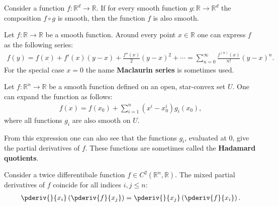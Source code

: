     \begin{theorem}[Boman]
        Consider a function $f:\mathbb{R}^d\rightarrow\mathbb{R}$. If for every smooth function $g:\mathbb{R}\rightarrow\mathbb{R}^d$ the composition $f\circ g$ is smooth, then the function $f$ is also smooth.
    \end{theorem}

    \begin{property}
        Let $f:\mathbb{R}\rightarrow\mathbb{R}$ be a smooth function. Around every point $x\in\mathbb{R}$ one can express $f$ as the following series:
        \begin{gather}
            f(y) = f(x) + f'(x)(y-x) + \frac{f''(x)}{2}(y-x)^2 + \cdots = \sum_{n=0}^\infty\frac{f^{(n)}(x)}{n!}(y-x)^n.
        \end{gather}
        For the special case $x=0$ the name \textbf{Maclaurin series} is sometimes used.
    \end{property}


    \begin{theorem}
        Let $f:\mathbb{R}^n\rightarrow\mathbb{R}$ be a smooth function defined on an open, star-convex set $U$. One can expand the function as follows:
        \begin{gather}
            f(x) = f(x_0) + \sum_{i=1}^n(x^i-x^i_0)g_i(x_0),
        \end{gather}
        where all functions $g_i$ are also smooth on $U$.
    \end{theorem}
    From this expression one can also see that the functions $g_i$, evaluated at 0, give the partial derivatives of $f$. These functions are sometimes called the \textbf{Hadamard quotients}.

    \begin{theorem}\label{calculus:schwarz_theorem}
        Consider a twice differentibale function $f\in C^2(\mathbb{R}^n,\mathbb{R})$. The mixed partial derivatives of $f$ coincide for all indices $i,j\leq n$:
        \begin{gather}
            \pderiv{}{x_i}\left(\pderiv{f}{x_j}\right) = \pderiv{}{x_j}\left(\pderiv{f}{x_i}\right).
        \end{gather}
    \end{theorem}

